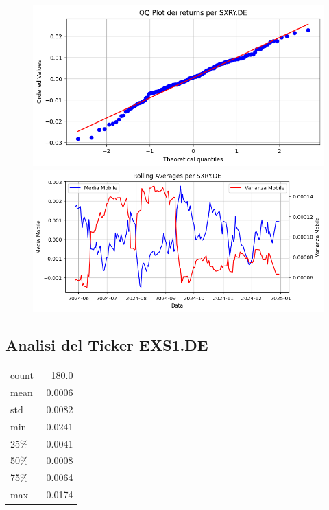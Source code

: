 \documentclass{article}%
\begin{document}
%


\begin{figure}[htbp]%
\begin{minipage}{0.48\textwidth}%
\includegraphics[width=\linewidth]{immagini_tickers/SXRY.DE_qq_plot.png}%
\end{minipage}%
\begin{minipage}{0.48\textwidth}%
\includegraphics[width=\linewidth]{immagini_tickers/SXRY.DE_rolling_averages.png}%
\end{minipage}%
\end{figure}

%
\subsection*{Analisi del Ticker EXS1.DE}%
\label{subsec:AnalisidelTickerEXS1.DE}%
\begin{tabular}{lr}%
count&180.0\\%
mean&0.0006\\%
std&0.0082\\%
min&{-}0.0241\\%
25\%&{-}0.0041\\%
50\%&0.0008\\%
75\%&0.0064\\%
max&0.0174\\%
\end{tabular}%
\end{document}
